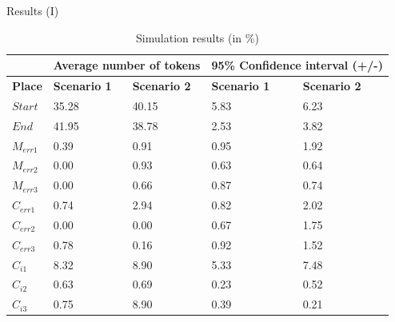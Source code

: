 \documentclass[xcolor=svgnames]{beamer}
\begin{document}
  \begin{frame}{ Results (I)}

{ \footnotesize
     \begin{table}[!h]
            \centering
            \caption{Simulation results  (in \%) }
            \label{table:simulationsAll}
            \begin{tabular}{|l|l||l|l||l|}
        	  \hline
        	 	        & \multicolumn{2}{c|}{ \textbf{Average number of tokens} } & \multicolumn{2}{c|}{ \textbf{95\% Confidence interval  (+/-)} }  \\
        	  \hline
        	  \textbf{Place}      &  \textbf{Scenario 1}   &   \textbf{Scenario 2}  	 &  \textbf{Scenario 1} 	  &   \textbf{Scenario 2} \\
        	  \hline
        	  $Start$ &    35.28	 &    40.15        &   5.83    	 &    6.23         \\
        	  $End$   &    41.95	 &    38.78        &   2.53  	  &  3.82	\\
              \hline
        	  $M_{err1}$	& 0.39	 & 0.91 		& 0.95	&  1.92	\\
        	  $M_{err2}$	& 0.00	 & 0.93 		& 0.63		&  0.64	\\
        	  $M_{err3}$	& 0.00   & 0.66 		& 0.87	&  0.74	\\
                \hline
        	  $C_{err1}$	& 0.74 	 & 2.94 	& 0.82	&  2.02	\\
        	  $C_{err2}$	& 0.00	 & 0.00 	& 0.67	&  1.75	\\
        	  $C_{err3}$ 	& 0.78	 & 0.16 	& 0.92	&  1.52	\\
                \hline
        	  $C_{i1}$ 	& 8.32	 & 8.90 	& 5.33	&  7.48	\\
              $C_{i2}$ 	& 0.63	 & 0.69 	& 0.23	&  0.52	\\
              $C_{i3}$ 	& 0.75	 & 8.90 	& 0.39	&  0.21	\\

        	  \hline
        	  \end{tabular}
        \end{table}
}
  \end{frame}
\end{document}
